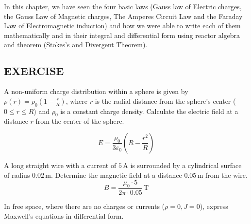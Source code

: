 In this chapter, we have seen the four basic laws (Gauss law of Electric charges, the Gauss Law of Magnetic charges, The Amperes Circuit Law and the Faraday Law of Electromagnetic induction) and how we were able to write each of them mathematically and in their integral and differential form using reactor algebra and theorem (Stokes's and Divergent Theorem).

\begin{mdframed}[backgroundcolor=lightblue, linewidth=1pt, hidealllines=true]
\section{EXERCISE}

\begin{ExerciseList}
	\Exercise[label={ex1}] A non-uniform charge distribution within a sphere is given by $\rho(r) = \rho_0 \left(1 - \frac{r}{R}\right)$, where $r$ is the radial distance from the sphere's center ($0 \leq r \leq R$) and $\rho_0$ is a constant charge density. Calculate the electric field at a distance $r$ from the center of the sphere.

%
%
%
%
%
\Answer[ref={ex1}]
\[E = \frac{\rho_0}{3\varepsilon_0}\left(R - \frac{r^2}{R}\right)\]

\Exercise[label={ex2}] A long straight wire with a current of $5 \, \text{A}$ is surrounded by a cylindrical surface of radius $0.02 \, \text{m}$. Determine the magnetic field at a distance $0.05 \, \text{m}$ from the wire.
\Answer[ref={ex1}]
\[B = \frac{\mu_0 \cdot 5}{2\pi \cdot 0.05} \, \text{T}\]

\Exercise[label={ex3}] In free space, where there are no charges or currents ($\rho = 0, J = 0$), express Maxwell's equations in differential form.

%


\end{ExerciseList}
\end{mdframed}
